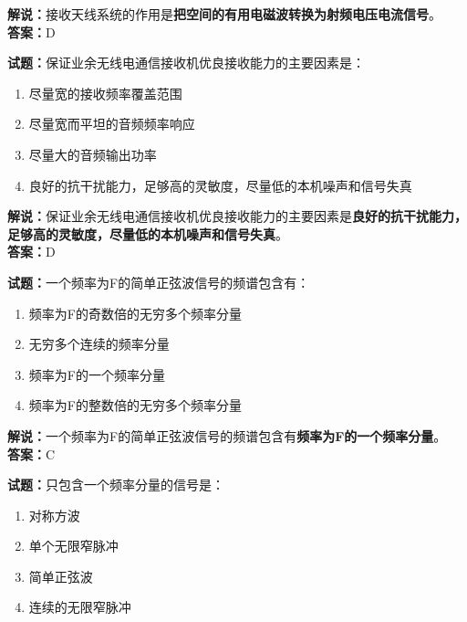 \documentclass{ctexbook}
\begin{document}
\noindent\textbf{解说：}接收天线系统的作用是\textbf{把空间的有用电磁波转换为射频电压电流信号}。\\\noindent\textbf{答案：}D%

\vspace{\baselineskip}

\noindent\textbf{试题：}保证业余无线电通信接收机优良接收能力的主要因素是：

\begin{enumerate}[leftmargin=3em]
  \item 尽量宽的接收频率覆盖范围
  \item 尽量宽而平坦的音频频率响应
  \item 尽量大的音频输出功率
  \item 良好的抗干扰能力，足够高的灵敏度，尽量低的本机噪声和信号失真
\end{enumerate}

\noindent\textbf{解说：}保证业余无线电通信接收机优良接收能力的主要因素是\textbf{良好的抗干扰能力，足够高的灵敏度，尽量低的本机噪声和信号失真}。\\\noindent\textbf{答案：}D%

\vspace{\baselineskip}

\noindent\textbf{试题：}一个频率为F的简单正弦波信号的频谱包含有：

\begin{enumerate}[leftmargin=3em]
  \item 频率为F的奇数倍的无穷多个频率分量
  \item 无穷多个连续的频率分量
  \item 频率为F的一个频率分量
  \item 频率为F的整数倍的无穷多个频率分量
\end{enumerate}

\noindent\textbf{解说：}一个频率为F的简单正弦波信号的频谱包含有\textbf{频率为F的一个频率分量}。\\\noindent\textbf{答案：}C

\vspace{\baselineskip}

\noindent\textbf{试题：}只包含一个频率分量的信号是：
\begin{enumerate}[leftmargin=3em]
  \item 对称方波
  \item 单个无限窄脉冲
  \item 简单正弦波
  \item 连续的无限窄脉冲
\end{enumerate}
\end{document}
